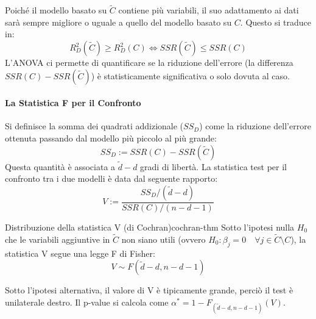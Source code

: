 Poiché il modello basato su \(\tilde{C}\) contiene più variabili, il suo
adattamento ai dati sarà sempre migliore o uguale a quello del modello basato
su \(C\). Questo si traduce in:
\[ R_D^2(\tilde{C}) \ge R_D^2(C) \iff SSR(\tilde{C}) \le SSR(C) \text{} \]
L'ANOVA ci permette di quantificare se la riduzione dell'errore (la differenza
\(SSR(C) - SSR(\tilde{C})\)) è statisticamente significativa o solo dovuta al
caso.

\paragraph{La Statistica F per il Confronto}
Si definisce la somma dei quadrati addizionale (\(SS_D\)) come la riduzione
dell'errore ottenuta passando dal modello più piccolo al più grande:
\[ SS_D := SSR(C) - SSR(\tilde{C}) \text{} \]
Questa quantità è associata a \(\tilde{d}-d\) gradi di libertà. La statistica
test per il confronto tra i due modelli è data dal seguente rapporto:
\[ V := \frac{SS_D / (\tilde{d}-d)}{SSR(C) / (n-d-1)} \text{} \]

\begin{teorema}{Distribuzione della statistica V (di Cochran)}{cochran-thm}
Sotto l'ipotesi nulla \(H_0\) che le variabili aggiuntive in \(\tilde{C}\) non
siano utili (ovvero \(H_0: \beta_j=0 \quad \forall j \in \tilde{C} \setminus
C\)), la statistica V segue una legge F di Fisher:
\[ V \sim F(\tilde{d}-d, n-d-1) \text{} \]
\end{teorema}

Sotto l'ipotesi alternativa, il valore di V è tipicamente grande, perciò il
test è unilaterale destro. Il p-value si calcola come \(\alpha^* = 1 -
F_{(\tilde{d}-d, n-d-1)}(V)\).

